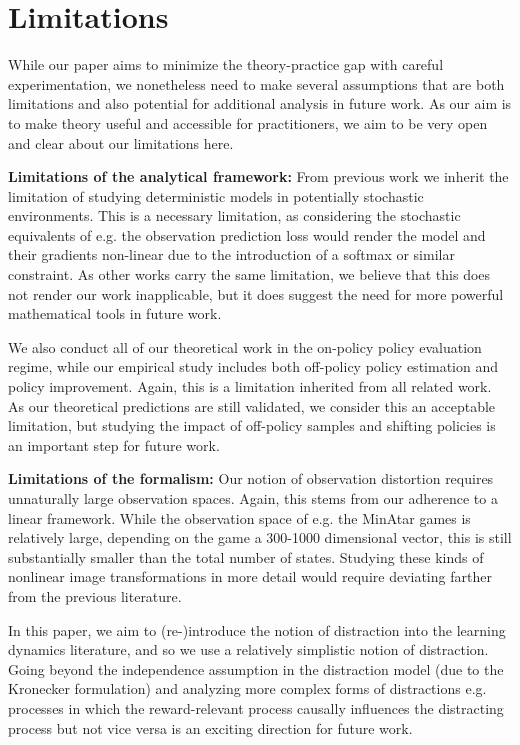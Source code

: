 \section{Limitations}
\label{app:limitations}

While our paper aims to minimize the theory-practice gap with careful experimentation, we nonetheless need to make several assumptions that are both limitations and also potential for additional analysis in future work.
As our aim is to make theory useful and accessible for practitioners, we aim to be very open and clear about our limitations here.

\textbf{Limitations of the analytical framework:} From previous work \parencite{tang2022understanding,lelan2023bootstrapped} we inherit the limitation of studying deterministic models in potentially stochastic environments.
This is a necessary limitation, as considering the stochastic equivalents of e.g. the observation prediction loss would render the model and their gradients non-linear due to the introduction of a softmax or similar constraint.
As other works carry the same limitation, we believe that this does not render our work inapplicable, but it does suggest the need for more powerful mathematical tools in future work.

We also conduct all of our theoretical work in the on-policy policy evaluation regime, while our empirical study includes both off-policy policy estimation and policy improvement.
Again, this is a limitation inherited from all related work.
As our theoretical predictions are still validated, we consider this an acceptable limitation, but studying the impact of off-policy samples and shifting policies is an important step for future work.

\textbf{Limitations of the formalism:} Our notion of observation distortion requires unnaturally large observation spaces. Again, this stems from our adherence to a linear framework.
While the observation space of e.g. the MinAtar games is relatively large, depending on the game a 300-1000 dimensional vector, this is still substantially smaller than the total number of states.
Studying these kinds of nonlinear image transformations in more detail would require deviating farther from the previous literature.

In this paper, we aim to (re-)introduce the notion of distraction into the learning dynamics literature, and so we use a relatively simplistic notion of distraction.
Going beyond the independence assumption in the distraction model (due to the Kronecker formulation) and analyzing more complex forms of distractions e.g. processes in which the reward-relevant process causally influences the distracting process but not vice versa is an exciting direction for future work.
